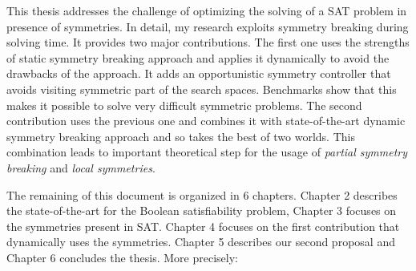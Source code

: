 %
%
%
This thesis addresses the challenge of optimizing the solving of a SAT problem in presence of
symmetries. In detail, my research exploits symmetry breaking during solving time.
It provides two major contributions. The first one uses the strengths of static symmetry 
breaking approach and applies it dynamically to avoid the drawbacks of the approach. 
It adds an opportunistic symmetry controller that avoids visiting symmetric part of the search spaces.
 Benchmarks show that this makes it possible to solve very difficult symmetric problems.
The second contribution uses the previous one and combines it with state-of-the-art dynamic 
symmetry breaking approach and so takes the best of two worlds. This combination leads to 
important theoretical step for the usage of \emph{partial symmetry breaking} and \emph{local symmetries}. 
 
The remaining of this document is organized in 6 chapters. Chapter 2 describes the state-of-the-art
 for the Boolean satisfiability problem, Chapter 3 focuses on the symmetries present in SAT.
Chapter 4 focuses on the first contribution that dynamically uses the symmetries.
Chapter 5 describes our second proposal and Chapter 6 concludes the thesis. More precisely:
 

